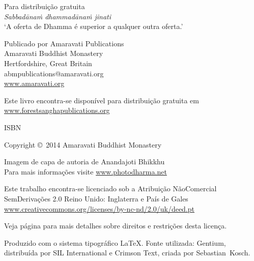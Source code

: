 \cleartoverso

\thispagestyle{empty}

{\small\setlength{\parskip}{0.8em}\setlength{\parindent}{0em}%
{\raggedright%

\thetitle

Para distribuição gratuita\\
\emph{Sabbadānaṁ dhammadānaṁ jinati}\\
‘A oferta de Dhamma é superior a qualquer outra oferta.’

Publicado por Amaravati Publications\\
Amaravati Buddhist Monastery\\
Hertfordshire, Great Britain\\
abmpublications@amaravati.org\\
\href{http://amaravati.org}{www.amaravati.org}

Este livro encontra-se disponível para distribuição gratuita em\\
\href{http://forestsanghapublications.org/}{www.forestsanghapublications.org}

ISBN \theISBN

Copyright \copyright\ 2014 Amaravati Buddhist Monastery

Imagem de capa de autoria de Anandajoti Bhikkhu\\
Para mais informações visite \href{http://www.photodharma.net/}{www.photodharma.net}

\vfill

{%

Este trabalho encontra-se licenciado sob a
Atribuição NãoComercial\\ SemDerivações 2.0 Reino Unido: Inglaterra e País de Gales\\
\href{http://creativecommons.org/licenses/by-nc-nd/2.0/uk/deed.pt}{www.creativecommons.org/licenses/by-nc-nd/2.0/uk/deed.pt}

Veja página \pageref{copyright-details} para mais detalhes sobre direitos e restrições desta licença.

Produzido com o sistema tipográfico \LaTeX. Fonte utilizada: Gentium, distribuída por SIL International e Crimson Text, criada por Sebastian~Kosch.


\theEditionInfo

}

}}

